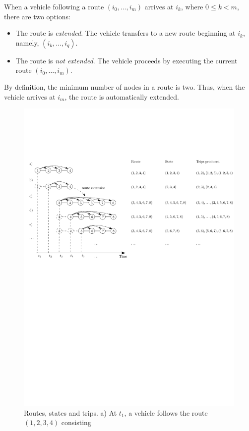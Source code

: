 \documentclass[dissertation,draft*]{aaltoseries}
\begin{document}
When a vehicle following a route $(i_0,\ldots,i_m)$ arrives at $i_k$, where $0 \leq k < m$, there
are two options:
\begin{itemize}
\item
The route is \emph{extended}. The vehicle transfers to a new route beginning at $i_k$, namely, $(i_{k},\ldots,i_q)$.
\item
The route is \emph{not extended}. The vehicle proceeds by executing the current route $(i_0,\ldots,i_m)$.
\end{itemize}
By definition, the minimum number of nodes in a route is two. Thus, when the vehicle arrives at $i_m$,
the route is automatically extended.


\begin{figure}[ht]
\begin{center}
\includegraphics[width=1.0\columnwidth]{esim01}
\caption{Routes, states and trips. a) At $t_1$, a vehicle follows the route $(1,2,3,4)$ consisting
}
\end{center}
\end{figure}
\end{document}
